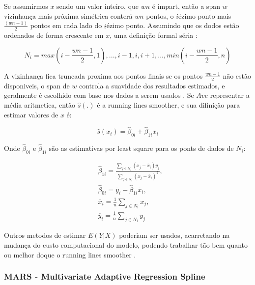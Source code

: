 \documentclass[
	12pt,				%
	openright,			%
	oneside,			%
	a4paper,			%
	english,			%
	brazil				%
	]{abntex2}
\begin{document}
Se assumirmos $x$ sendo um valor inteiro, que $wn$ é impart, então a span $w$ vizinhança mais próxima simétrica conterá
$wn$ pontos, o $i$ézimo ponto mais $\frac{(wn - 1)}{2}$ pontos em cada lado do $i$ézimo ponto. Assumindo que os dodos
estão ordenados de forma crescente em $x$, uma definição formal séria \cite{GAM}:

\begin{equation}
	\label{eq_vizinhanaça}
	N_i = {max(i-\frac{wn-1}{2},1),...,i-1,i,i+1,...,min(i-\frac{wn-1}{2},n)}
\end{equation}

A vizinhança fica truncada proxima aos pontos finais se os pontos $\frac{wn-1}{2}$ não estão disponiveis, o span de $w$
controla a suavidade dos resultados estimados, e geralmente é escolhido com base nos dados a serem usados \cite{GAM}. Se
$Ave$ representar a média aritmetica, então $\hat{s}(.)$ é a running lines smoother, e sua difinição para estimar valores
de $x$ é:

\begin{equation}
	\label{running_lines_smoother}
	\hat{s}(x_i) = \hat{\beta}_{0i} + \hat{\beta}_{1i}x_i
\end{equation}

Onde $\hat{\beta}_{0i}$ e $\hat{\beta}_{1i}$ são as estimativas por least square para os ponts de dados de $N_i$:

\begin{equation}
	\label{least_square_betas}
	\begin{split}
		&\hat{\beta}_{1i} = \frac{\sum_{j \in N_i}(x_j - \overline{x}_i)y_j}{\sum_{j \in N_i}(x_j - \overline{x}_i)^2}, \\
		&\hat{\beta}_{0i} = \overline{y}_i - \hat{\beta}_{1i}\overline{x}_i, \\
		&\overline{x}_i = \frac{1}{n}\sum_{j \in N_i}x_j, \\
		&\overline{y}_i = \frac{1}{n}\sum_{j \in N_i}y_j
	\end{split}
\end{equation}

Outros metodos de estimar $E(Y|X)$ poderiam ser usados, acarretando na mudança do custo computacional do modelo, podendo
trabalhar tão bem quanto ou melhor doque o running lines smoother \cite{GAM}.

\subsubsection{MARS - Multivariate Adaptive Regression Spline}
\end{document}
